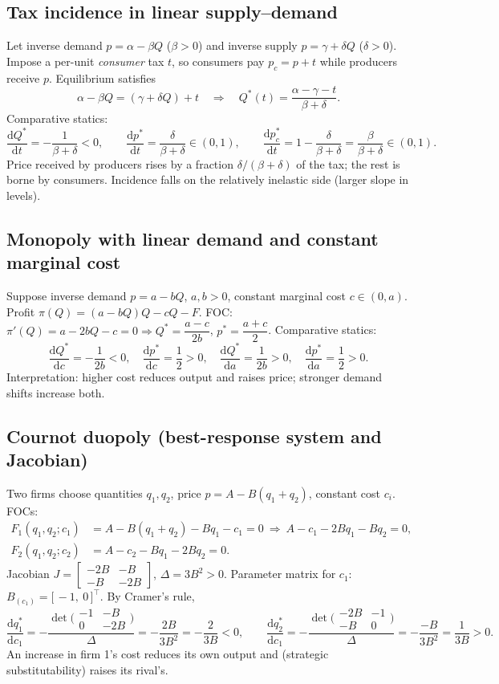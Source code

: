 \documentclass[11pt]{article}
\newcommand{\dtotal}[2]{\frac{\mathrm{d} #1}{\mathrm{d} #2}}
\begin{document}
\subsection{Tax incidence in linear supply--demand}
Let inverse demand \(p = \alpha - \beta Q\) (\(\beta>0\)) and inverse supply \(p = \gamma + \delta Q\) (\(\delta>0\)). Impose a per-unit \emph{consumer} tax \(t\), so consumers pay \(p_c=p+t\) while producers receive \(p\). Equilibrium satisfies
\[
\alpha - \beta Q = (\gamma + \delta Q) + t \quad\Rightarrow\quad Q^\ast(t)=\frac{\alpha-\gamma - t}{\beta+\delta}.
\]
Comparative statics:
\[
\dtotal{Q^\ast}{t}=-\frac{1}{\beta+\delta}<0,\qquad
\dtotal{p^\ast}{t}=\frac{\delta}{\beta+\delta}\in(0,1),\qquad
\dtotal{p_c^\ast}{t}=1-\frac{\delta}{\beta+\delta}=\frac{\beta}{\beta+\delta}\in(0,1).
\]
Price received by producers rises by a fraction \(\delta/(\beta+\delta)\) of the tax; the rest is borne by consumers. Incidence falls on the relatively inelastic side (larger slope in levels).

\subsection{Monopoly with linear demand and constant marginal cost}
Suppose inverse demand \(p=a-bQ\), \(a,b>0\), constant marginal cost \(c\in(0,a)\). Profit \(\pi(Q)=(a-bQ)Q-cQ-F\). FOC: \(\pi'(Q)=a-2bQ-c=0\Rightarrow Q^\ast=\dfrac{a-c}{2b}\), \(p^\ast=\dfrac{a+c}{2}\).
Comparative statics:
\[
\dtotal{Q^\ast}{c}=-\frac{1}{2b}<0,\quad
\dtotal{p^\ast}{c}=\frac12>0,\quad
\dtotal{Q^\ast}{a}=\frac{1}{2b}>0,\quad
\dtotal{p^\ast}{a}=\frac12>0.
\]
Interpretation: higher cost reduces output and raises price; stronger demand shifts increase both.

\subsection{Cournot duopoly (best-response system and Jacobian)}
Two firms choose quantities \(q_1,q_2\), price \(p=A-B(q_1+q_2)\), constant cost \(c_i\). FOCs:
\[
\begin{aligned}
F_1(q_1,q_2;c_1)&=A-B(q_1+q_2)-Bq_1-c_1=0 \ \Rightarrow\ A-c_1 -2Bq_1 -Bq_2=0,\\
F_2(q_1,q_2;c_2)&=A-c_2 -Bq_1 -2Bq_2=0.
\end{aligned}
\]
Jacobian \(J=\begin{bmatrix}-2B & -B\\ -B & -2B\end{bmatrix}\), \(\Delta=3B^2>0\).
Parameter matrix for \(c_1\): \(B_{(c_1)}=\big[\,-1,\ 0\,\big]^\top\).
By Cramer's rule,
\[
\dtotal{q_1^\ast}{c_1}=-\frac{\det\big(\begin{smallmatrix}\boxed{-1}&-B\\[1pt]\boxed{0}&-2B\end{smallmatrix}\big)}{\Delta}
=-\frac{2B}{3B^2}=-\frac{2}{3B}<0,\qquad
\dtotal{q_2^\ast}{c_1}=-\frac{\det\big(\begin{smallmatrix}-2B&\boxed{-1}\\[1pt]-B&\boxed{0}\end{smallmatrix}\big)}{\Delta}
=-\frac{-B}{3B^2}=\frac{1}{3B}>0.
\]
An increase in firm 1's cost reduces its own output and (strategic substitutability) raises its rival's.
\end{document}
